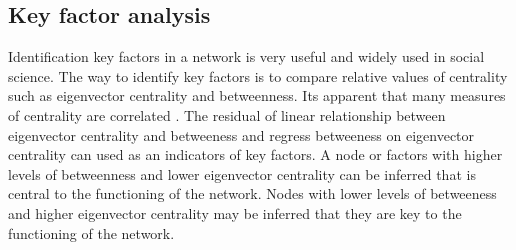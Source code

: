 \subsection*{Key factor analysis}

Identification key factors in a network is very useful and widely used in social science. The way to identify key factors is to compare relative values of centrality such as eigenvector centrality and betweenness. Its apparent that many measures of centrality are correlated \cite{Valente_2008}.  The residual of linear relationship between eigenvector centrality and betweeness and regress betweeness on eigenvector centrality can used as an indicators of key factors. A node or factors with higher levels of betweenness and lower eigenvector centrality can be inferred that is central to the functioning of the network. Nodes with lower levels of betweeness and higher eigenvector centrality may be inferred that they are key to the functioning of the network.